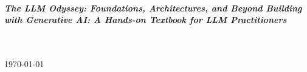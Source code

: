 \documentclass[12pt, oneside]{Thesis} %
\begin{document}
\begin{titlepage}
	\begin{center}
		
		
		
		{\LARGE \bfseries \ttitle}\\[1.5cm] %
		
		\large \textit{\textbf{The LLM Odyssey: Foundations, Architectures, and Beyond Building with Generative AI: A Hands-on Textbook for LLM Practitioners}\\
		}
		
		
		
		
		
		
		{\large \textbf{\deptname}}\\[0.3cm]%
		\textsc{\LARGE \textbf{\univname}}\\[0.5cm] %
		{\large \today}\\[4cm] %
		
		\vfill
	\end{center}
	
\end{titlepage}
\end{document}
